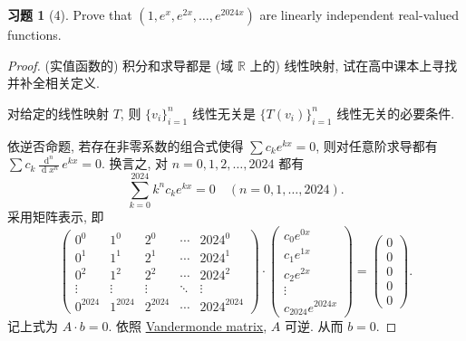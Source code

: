 \documentclass[11pt]{ctexart}
\theoremstyle{definition}
\numberwithin{equation}{section}
\theoremstyle{definition}
\newtheorem*{exercise}{习题}
\theoremstyle{remark}
\begin{document}
\begin{exercise}[4]
    Prove that $(1,e^x,e^{2x},\ldots, e^{2024 x})$ are linearly independent real-valued functions. 
    \begin{proof}
        (实值函数的) 积分和求导都是 (域 $\mathbb R$ 上的) 线性映射, 试在高中课本上寻找并补全相关定义. 
        \begin{pinked}
            对给定的线性映射 $T$, 则 $\{v_i\}_{i=1}^n$ 线性无关是 $\{T(v_i)\}_{i=1}^n$ 线性无关的必要条件. 
        \end{pinked}
        依逆否命题, 若存在非零系数的组合式使得 $\sum c_k e^{kx}=0$, 则对任意阶求导都有 $\sum c_k \frac{\operatorname{d}^n}{\operatorname{d} x^n} e^{kx}=0$. 换言之, 对 $n=0,1,2,\ldots, 2024$ 都有
        \begin{equation}
            \sum_{k=0}^{2024} k^n c_ke^{kx}=0\quad (n=0,1,\ldots, 2024). 
        \end{equation}
        采用矩阵表示, 即 
        \begin{equation}
            \begin{pmatrix}
                0^{0} & 1^{0} & 2^{0} & \cdots  & 2024^{0}\\
                0^{1} & 1^{1} & 2^{1} & \cdots  & 2024^{1}\\
                0^{2} & 1^{2} & 2^{2} & \cdots  & 2024^{2}\\
                \vdots  & \vdots  & \vdots  & \ddots  & \vdots \\
                0^{2024} & 1^{2024} & 2^{2024} & \cdots  & 2024^{2024}
                \end{pmatrix} \cdot \begin{pmatrix}
                c_{0} e^{0x}\\
                c_{1} e^{1x}\\
                c_{2} e^{2x}\\
                \vdots \\
                c_{2024} e^{2024x}
                \end{pmatrix} =\begin{pmatrix}
                0\\
                0\\
                0\\
                0\\
                0
                \end{pmatrix} .
        \end{equation}
        记上式为 $A\cdot b=0$. 依照 \href{https://en.wikipedia.org/wiki/Vandermonde_matrix}{Vandermonde matrix}, $A$ 可逆. 从而 $b=0$. 
    \end{proof}
\end{exercise}
\end{document}
